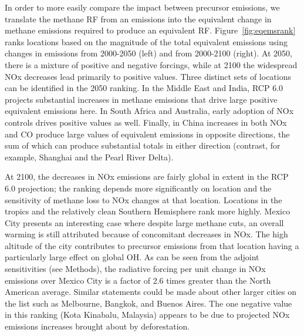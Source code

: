 In order to more easily compare the impact between precursor emissions, we translate the methane RF from an emissions into the equivalent change in methane emissions required to produce an equivalent RF. Figure~\ref{fig:eqemsrank} ranks locations based on the magnitude of the total equivalent emissions using changes in emissions from 2000-2050 (left) and from 2000-2100 (right). At 2050, there is a mixture of positive and negative forcings, while at 2100 the widespread NOx decreases lead primarily to positive values. Three distinct sets of locations can be identified in the 2050 ranking. In the Middle East and India, RCP 6.0 projects substantial increases in methane emissions that drive large positive equivalent emissions here. In South Africa and Australia, early adoption of NOx controls drives positive values as well. Finally, in China increases in both NOx and CO produce large values of equivalent emissions in opposite directions, the sum of which can produce substantial totals in either direction (contrast, for example, Shanghai and the Pearl River Delta).

At 2100, the decreases in NOx emissions are fairly global in extent in the RCP 6.0 projection; the ranking depends more significantly on location and the sensitivity of methane loss to NOx changes at that location. Locations in the tropics and the relatively clean Southern Hemisphere rank more highly. Mexico City presents an interesting case where despite large methane cuts, an overall warming is still attributed because of concomitant decreases in NOx. The high altitude of the city contributes to precursor emissions from that location having a particularly large effect on global OH. As can be seen from the adjoint sensitivities (see Methods), the radiative forcing per unit change in NOx emissions over Mexico City is a factor of 2.6 times greater than the North American average. Similar statements could be made about other larger cities on the list such as Melbourne, Bangkok, and Buenos Aires. The one negative value in this ranking (Kota Kinabalu, Malaysia) appears to be due to projected NOx emissions increases brought about by deforestation.